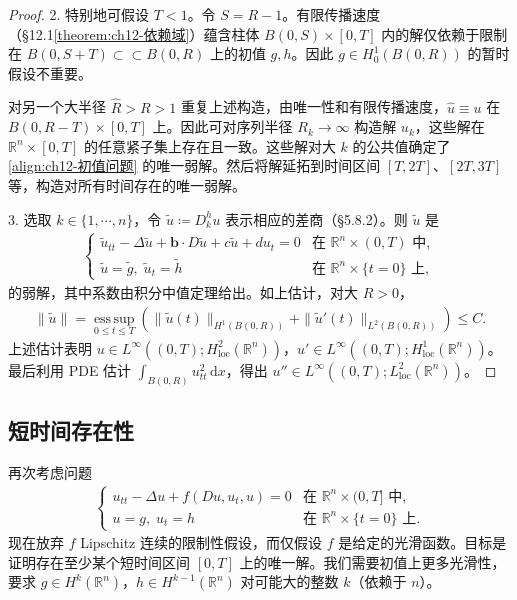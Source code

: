 \documentclass[../../main.tex]{subfiles}
\begin{document}
\begin{proof}
2. 特别地可假设 $T<1$。令 $S=R-1$。有限传播速度（\S12.1\cref{theorem:ch12-依赖域}）蕴含柱体 $B(0,S)\times[0,T]$ 内的解仅依赖于限制在 $B(0,S+T)\subset\subset B(0,R)$ 上的初值 $g,h$。因此 $g\in H^1_0(B(0,R))$ 的暂时假设不重要。

对另一个大半径 $\widehat{R}>R>1$ 重复上述构造，由唯一性和有限传播速度，$\widehat{u}\equiv u$ 在 $B(0,R-T)\times[0,T]$ 上。因此可对序列半径 $R_k\to\infty$ 构造解 $u_k$，这些解在 $\mathbb{R}^n\times[0,T]$ 的任意紧子集上存在且一致。这些解对大 $k$ 的公共值确定了\eqref{align:ch12-初值问题} 的唯一弱解。然后将解延拓到时间区间 $[T,2T]$、$[2T,3T]$ 等，构造对所有时间存在的唯一弱解。

3. 选取 $k\in\{1,\cdots,n\}$，令 $\widetilde{u}\coloneqq D_k^hu$ 表示相应的差商（\S5.8.2）。则 $\widetilde{u}$ 是
\begin{align*}
\begin{cases}
\widetilde{u}_{tt}-\Delta\widetilde{u}+\mathbf{b}\cdot D\widetilde{u}+c\widetilde{u}+d u_t=0 & \text{在 } \mathbb{R}^n\times(0,T) \text{ 中},\\
\widetilde{u}=\widetilde{g},\;\widetilde{u}_t=\widetilde{h} & \text{在 } \mathbb{R}^n\times\{t=0\} \text{ 上},
\end{cases}
\end{align*}
的弱解，其中系数由积分中值定理给出。如上估计，对大 $R>0$，
\begin{align*}
\|\widetilde{u}\|=\operatorname*{ess\,sup}_{0\leqslant t\leqslant T}(\|\widetilde{u}(t)\|_{H^1(B(0,R))}+\|\widetilde{u}'(t)\|_{L^2(B(0,R))})\leqslant C.
\end{align*}
上述估计表明 $u\in L^\infty((0,T);H^2_{\mathrm{loc}}(\mathbb{R}^n))$，$u'\in L^\infty((0,T);H^1_{\mathrm{loc}}(\mathbb{R}^n))$。最后利用 PDE 估计 $\int_{B(0,R)}u_{tt}^2\,\mathrm{d}x$，得出 $u''\in L^\infty((0,T);L^2_{\mathrm{loc}}(\mathbb{R}^n))$。
\end{proof}

\subsection{短时间存在性}\label{subsection:ch12-短时间存在性}

再次考虑问题
\begin{align}
\begin{cases}
u_{tt}-\Delta u+f(Du,u_t,u)=0 & \text{在 } \mathbb{R}^n\times(0,T] \text{ 中},\\
u=g,\;u_t=h & \text{在 } \mathbb{R}^n\times\{t=0\} \text{ 上}.
\end{cases}
\label{align:ch12-短时间问题}
\end{align}
现在放弃 $f$ Lipschitz 连续的限制性假设，而仅假设 $f$ 是给定的光滑函数。目标是证明存在至少某个短时间区间 $[0,T]$ 上的唯一解。我们需要初值上更多光滑性，要求 $g\in H^k(\mathbb{R}^n)$，$h\in H^{k-1}(\mathbb{R}^n)$ 对可能大的整数 $k$（依赖于 $n$）。
\end{document}
